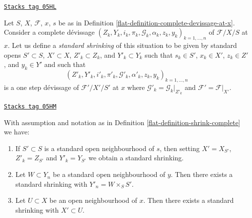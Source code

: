 \begin{definition}
\label{flat-definition-shrink-complete}
\href{https://stacks.math.columbia.edu/tag/05HL}{\texttt{Stacks tag 05HL}}

Let $S$, $X$, $\mathcal{F}$, $x$, $s$ be as in
Definition \ref{flat-definition-complete-devissage-at-x}.
Consider a complete d\'evissage
$(Z_k, Y_k, i_k, \pi_k, \mathcal{G}_k, \alpha_k, z_k, y_k)_{k = 1, \ldots, n}$
of $\mathcal{F}/X/S$ at $x$. Let us define a
{\it standard shrinking} of this situation to be
given by standard opens $S' \subset S$, $X' \subset X$,
$Z'_k \subset Z_k$, and $Y'_k \subset Y_k$ such that $s_k \in S'$,
$x_k \in X'$, $z_k \in Z'$, and $y_k \in Y'$ and such that
$$
(Z'_k, Y'_k, i'_k, \pi'_k,
\mathcal{G}'_k, \alpha'_k, z_k, y_k)_{k = 1, \ldots, n}
$$
is a one step d\'evissage of $\mathcal{F}'/X'/S'$ at $x$ where
$\mathcal{G}'_k = \mathcal{G}_k|_{Z'_k}$ and
$\mathcal{F}' = \mathcal{F}|_{X'}$.
\end{definition}

\begin{lemma}
\label{flat-lemma-shrink-complete}
\href{https://stacks.math.columbia.edu/tag/05HM}{\texttt{Stacks tag 05HM}}

With assumption and notation as in
Definition \ref{flat-definition-shrink-complete}
we have:
\begin{enumerate}
\item
\label{flat-item-shrink-base-complete}
If $S' \subset S$ is a standard open neighbourhood of $s$, then
setting $X' = X_{S'}$, $Z'_k = Z_{S'}$ and $Y'_k = Y_{S'}$ we obtain a
standard shrinking.
\item
\label{flat-item-shrink-on-Y-complete}
Let $W \subset Y_n$ be a standard open neighbourhood of $y$.
Then there exists a standard shrinking with $Y'_n = W \times_S S'$.
\item
\label{flat-item-shrink-on-X-complete}
Let $U \subset X$ be an open neighbourhood of $x$.
Then there exists a standard shrinking with $X' \subset U$.
\end{enumerate}
\end{lemma}

